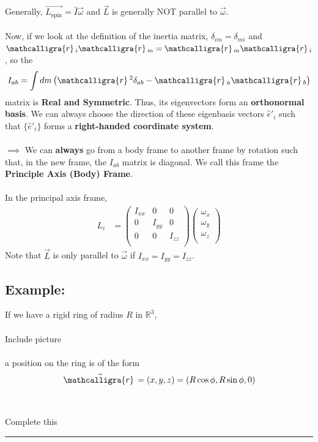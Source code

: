 \documentclass[11pt]{article}
\newcommand{\scriptr}{\mathcalligra{r}\,}
\begin{document}
Generally, $\vec{L_{\text{spin}}} = \hat{I} \vec{\omega}$ and $\vec{L}$ is generally NOT parallel to $\vec{\omega}$.
\\
\\
Now, if we look at the definition of the inertia matrix, $\delta_{im} = \delta_{mi}$ and $\scriptr_{i} \scriptr_{m} = \scriptr_{m} \scriptr_{i}$, so the 
\[  I_{ab} = \int dm \left( \scriptr^2 \delta_{ab} - \scriptr_a \scriptr_{b} \right)   \]
matrix is \textbf{Real and Symmetric}. Thus, its eigenvectors form an \textbf{orthonormal basis}. We can always choose the direction of these eigenbasis vectors $\hat{e}'_{i}$ such that $\{ \hat{e}'_i \}$ forms a \textbf{right-handed coordinate system}.
\\
\\
$\implies$ We can \textbf{always} go from a body frame to another frame by rotation such that, in the new frame, the $I_{ab}$ matrix is diagonal. We call this frame the \textbf{Principle Axis (Body) Frame}.
\\
\\
In the principal axis frame, 
\begin{align*}
  L_{i} &= \begin{pmatrix}
    I_{xx} & 0 & 0 \\
    0 & I_{yy} & 0 \\
    0 & 0 & I_{zz} \\
  \end{pmatrix} \begin{pmatrix}
    \omega_x \\ 
    \omega_y \\ 
    \omega_z \\ 
  \end{pmatrix}
\end{align*}
Note that $\vec{L}$ is only parallel to $\vec{\omega}$ if $I_{xx} = I_{yy} = I_{zz}$.

\vskip 1cm
\subsection{Example: }
If we have a rigid ring of radius $R$ in $\mathbb{R}^3$, 
\\
\\
Include picture
\\
\\
a position on the ring is of the form 
\[ \vec{\scriptr} = (x, y, z) = (R\cos\phi, R\sin\phi, 0)  \]
\\
\\
Complete this 
\hrule
\end{document}
